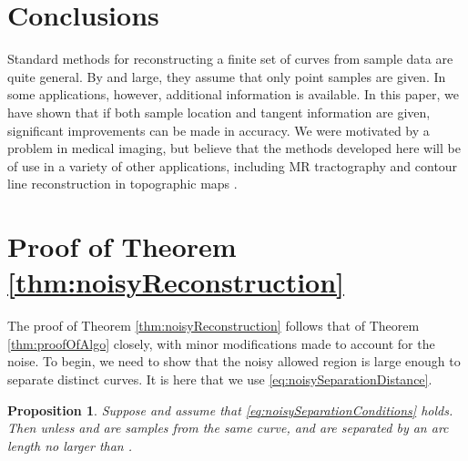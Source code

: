 \documentclass{article}
\newtheorem{proposition}[cntr]{Proposition}
\numberwithin{cntr}{section}
\numberwithin{equation}{section}
\begin{document}
\section{Conclusions}

Standard methods for reconstructing a finite set of
curves from sample data are quite general.
By and large, they assume that only point samples are given.
In some applications, however, additional information is available.
In this paper, we have shown that if both sample location and
tangent information are given, significant improvements can be made
in accuracy. We were motivated by a problem in medical imaging,
but believe that
the methods developed here will be of use in a variety of other applications,
including MR tractography and contour line reconstruction in topographic
maps \cite{GORE,TOPO}.

\appendix

\section{Proof of Theorem \ref{thm:noisyReconstruction}}
\label{sec:proofOfNoisyReconstruction}
The proof of Theorem \ref{thm:noisyReconstruction} follows that of
Theorem \ref{thm:proofOfAlgo} closely, with minor modifications
made to account for the noise.
To begin, we need to show that the noisy allowed region is large enough
to separate distinct curves. It is here that we use
\eqref{eq:noisySeparationDistance}.

\begin{proposition}
  Suppose  and assume that
  \eqref{eq:noisySeparationConditions} holds.
  Then  unless  and 
  are samples from the same curve, and are separated by an arc length no
  larger than .
\end{proposition}
\end{document}
